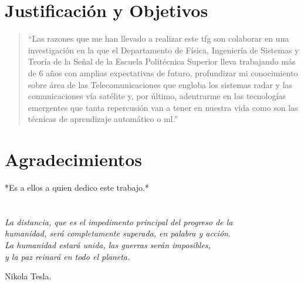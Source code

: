 
\chapter*{Justificación y Objetivos}
\thispagestyle{empty}
\begin{quote}
``Las razones que me han llevado a realizar este \gls{tfg} son colaborar en una investigación en la que el Departamento de Física, Ingeniería de Sistemas y Teoría de la Señal de la Escuela Politécnica Superior lleva trabajando más de 6 años con amplias expectativas de futuro, profundizar mi conocimiento sobre área de las Telecomunicaciones que engloba los sistemas radar y las comunicaciones vía satélite y, por último, adentrarme en las tecnologías emergentes que tanta repercusión van a tener en nuestra vida como son las técnicas de aprendizaje automático o \gls{ml}.''
\end{quote}


\cleardoublepage %
\chapter*{Agradecimientos}

\thispagestyle{empty}
\vspace{1cm}


*Es a ellos a quien dedico este trabajo.*


\cleardoublepage %
\chapter*{}
\setlength{\leftmargin}{0.5\textwidth}
\setlength{\parsep}{0cm}
\addtolength{\topsep}{0.5cm}
\begin{flushright}
\small\em{
La distancia, que es el impedimento principal del progreso de la \\ humanidad, será completamente superada, en palabra y acción.\\
La humanidad estará unida, las guerras serán imposibles, \\
y la paz reinará en todo el planeta.
}
\end{flushright}
\begin{flushright}
\small{
Nikola Tesla.
}
\end{flushright}
\cleardoublepage %
